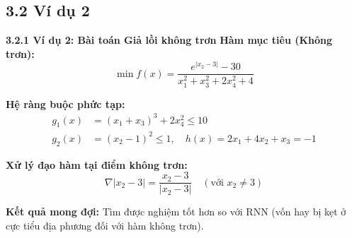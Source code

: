 \subsection{3.2 Ví dụ 2}
\begin{frame}{\textbf{\large 3.2.1 Ví dụ 2: Bài toán Giả lồi không trơn}}
    \vspace*{-1cm} %
    \small 
    \textbf{Hàm mục tiêu (Không trơn):}
    \begin{equation*}
        \min f(x) = \frac{e^{|x_2 - 3|} - 30}{x_1^2 + x_3^2 + 2x_4^2 + 4}
    \end{equation*}
    
    \vspace{-0.2cm}
    \textbf{Hệ ràng buộc phức tạp:}
    \vspace{-0.3cm}
    \begin{align*}
        g_1(x) &= (x_1 + x_3)^3 + 2x_4^2 \le 10 \\
        g_2(x) &= (x_2 - 1)^2 \le 1, \quad h(x) = 2x_1 + 4x_2 + x_3 = -1
    \end{align*}

    \textbf{Xử lý đạo hàm tại điểm không trơn:}
    \vspace{-0.2cm}
    $$ \nabla |x_2 - 3| = \frac{x_2 - 3}{|x_2 - 3|} \quad (\text{với } x_2 \neq 3) $$
    
    \textbf{Kết quả mong đợi:} Tìm được nghiệm tốt hơn so với RNN (vốn hay bị kẹt ở cực tiểu địa phương đối với hàm không trơn).
\end{frame}


